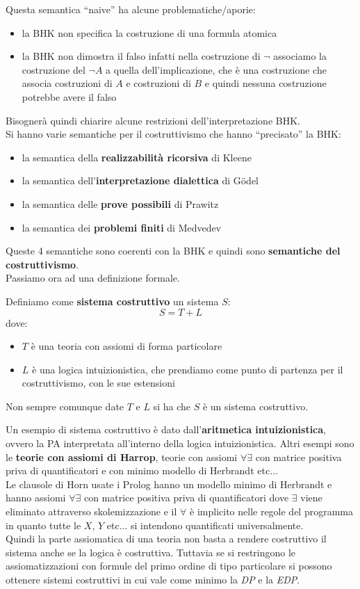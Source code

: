 \documentclass[a4paper,12pt, oneside]{book}
\begin{document}
Questa semantica ``naive'' ha alcune problematiche/aporie:
\begin{itemize}
  \item la BHK non specifica la costruzione di una formula atomica
  \item la BHK non dimostra il falso infatti nella costruzione di $\neg$
  associamo la costruzione del $\neg A$ a quella dell'implicazione, che è una
  costruzione che associa costruzioni di $A$ e costruzioni di $B$ e quindi
  nessuna costruzione potrebbe avere il falso
\end{itemize}
Bisognerà quindi chiarire alcune restrizioni dell'interpretazione BHK.\\
Si hanno varie semantiche per il costruttivismo che hanno ``precisato'' la BHK:
\begin{itemize}
  \item la semantica della \textbf{realizzabilità ricorsiva} di Kleene
  \item la semantica dell'\textbf{interpretazione dialettica} di G\"{o}del
  \item la semantica delle \textbf{prove possibili} di Prawitz
  \item la semantica dei \textbf{problemi finiti} di Medvedev
\end{itemize}
Queste 4 semantiche sono coerenti con la BHK e quindi sono \textbf{semantiche
  del costruttivismo}.\\
Passiamo ora ad una definizione formale.
\begin{definizione}
  Definiamo come \textbf{sistema costruttivo} un sistema $S$:
  \[S=T+L\]
  dove:
  \begin{itemize}
    \item $T$ è una teoria con assiomi di forma particolare
    \item $L$ è una logica intuizionistica, che prendiamo come punto di partenza
    per il costruttivismo, con le sue estensioni
  \end{itemize}
  Non sempre comunque date $T$ e $L$ si ha che $S$ è un sistema costruttivo.
\end{definizione}
Un esempio di sistema costruttivo è dato dall'\textbf{aritmetica
  intuizionistica}, ovvero la PA interpretata all'interno della logica
intuizionistica. Altri esempi sono le \textbf{teorie con assiomi di Harrop},
teorie con assiomi $\forall\exists$ con matrice positiva priva di quantificatori
e con minimo modello di Herbrandt etc$\ldots$\\ 
Le clausole di Horn usate i Prolog hanno un
modello minimo di Herbrandt e hanno  assiomi $\forall\exists$ con matrice
positiva priva di quantificatori dove $\exists$ viene eliminato attraverso
skolemizzazione e il $\forall$ è implicito nelle regole del programma in quanto
tutte le $X$, $Y$ etc$\ldots$ si intendono quantificati universalmente.\\
Quindi la parte assiomatica di una teoria non basta a rendere costruttivo il
sistema anche se la logica è costruttiva. Tuttavia se si restringono le
assiomatizzazioni con formule del primo ordine di tipo particolare si possono
ottenere sistemi costruttivi in cui vale come minimo la \textit{DP} e la
\textit{EDP}.
\end{document}
